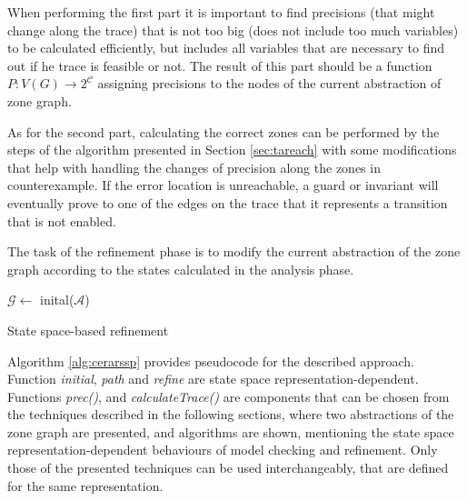 When performing the first part it is important to find precisions (that might change along the trace) that is not too big (does not include too much variables) to be calculated efficiently, but includes all variables that are necessary to find out if he trace is feasible or not. The result of this part should be a function $P: V(G) \to 2^\mathcal{C}$ assigning precisions to the nodes of the current abstraction of zone graph.

As for the second part, calculating the correct zones can be performed by the steps of the algorithm presented in Section \ref{sec:tareach} with some modifications that help with handling the changes of precision along the zones in counterexample. If the error location is unreachable, a guard or invariant will eventually prove to one of the edges on the trace that it represents a transition that is not enabled.

The task of the refinement phase is to modify the current abstraction of the zone graph according to the states calculated in the analysis phase.

\begin{algorithm}
	\BlankLine
	$\mathcal{G} \leftarrow$ inital($\mathcal{A}$) 
	\caption{State space-based refinement} \label{alg:cerarssp}
\end{algorithm}

Algorithm \ref{alg:cerarssp} provides pseudocode for the described approach. Function \emph{initial}, \emph{path} and \emph{refine} are state space representation-dependent. Functions \emph{prec()},  and \emph{calculateTrace()} are components that can be chosen from the techniques described in the following sections, where two abstractions of the zone graph are presented, and algorithms are shown, mentioning the state space representation-dependent behaviours of model checking and refinement. Only those of the presented techniques can be used interchangeably, that are defined for the same representation.


